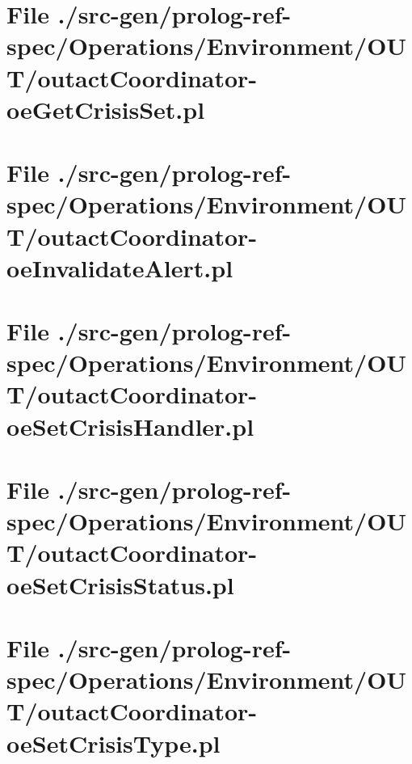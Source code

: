 \section[File /src-gen/prolog-ref-spec/Operations.../outactCoordinator-oeGetCrisisSet.pl]{File ./src-gen/prolog-ref-spec/Operations/Environment/OUT/outactCoordinator-oeGetCrisisSet.pl}
\scriptsize

\normalsize
	
\section[File /src-gen/prolog-ref-spec.../outactCoordinator-oeInvalidateAlert.pl]{File ./src-gen/prolog-ref-spec/Operations/Environment/OUT/outactCoordinator-oeInvalidateAlert.pl}
\scriptsize

\normalsize
	
\section[File /src-gen/prolog-ref-spec.../outactCoordinator-oeSetCrisisHandler.pl]{File ./src-gen/prolog-ref-spec/Operations/Environment/OUT/outactCoordinator-oeSetCrisisHandler.pl}
\scriptsize

\normalsize
	
\section[File /src-gen/prolog-ref-spec.../outactCoordinator-oeSetCrisisStatus.pl]{File ./src-gen/prolog-ref-spec/Operations/Environment/OUT/outactCoordinator-oeSetCrisisStatus.pl}
\scriptsize

\normalsize
	
\section[File /src-gen/prolog-ref-spec.../outactCoordinator-oeSetCrisisType.pl]{File ./src-gen/prolog-ref-spec/Operations/Environment/OUT/outactCoordinator-oeSetCrisisType.pl}
\scriptsize

\normalsize
	
